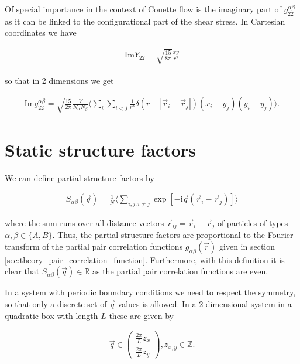 \documentclass[DIV=9,11pt,BCOR=5mm,twoside=semi,abstract]{scrreprt}
\begin{document}
	Of special importance in the context of Couette flow is the imaginary part of $g_{22}^{\alpha\beta}$ as it can be linked to the configurational part of the shear stress. In Cartesian coordinates we have 
	
	\begin{align}
		\text{Im}Y_{22} = \sqrt{\frac{15}{8\pi}} \frac{xy}{r^2}
	\end{align}

	so that in 2 dimensions we get
	
	\begin{align}
		\text{Im} g_{22}^{\alpha\beta} = \sqrt{\frac{15}{2\pi}} \frac{V}{N_{\alpha} N_{\beta}} \langle \sum_{i} \sum_{i < j} \frac{1}{r^3} \delta \left( r - | \vec{r}_i - \vec{r}_j | \right) (x_i - y_j)(y_i - y_j) \rangle.
	\end{align}


	\section{Static structure factors}
	\label{sec:theory_structure_factors}
	
	We can define partial structure factors by
	
	\begin{align}
		S_{\alpha\beta}(\vec{q}) = \frac{1}{N} \langle \sum_{i,j,i \neq j} \exp\left[ -\text{i} \vec{q} (\vec{r}_i - \vec{r}_j) \right] \rangle
	\end{align}

	where the sum runs over all distance vectors $\vec{r}_{ij} = \vec{r}_i - \vec{r}_j$ of particles of types $\alpha,\beta \in \{A,B\}$. Thus, the partial structure factors are proportional to the Fourier transform of the partial pair correlation functions $g_{\alpha\beta}(\vec{r})$ given in section \ref{sec:theory_pair_correlation_function}. Furthermore, with this definition it is clear that $S_{\alpha\beta} (\vec{q}) \in \mathds{R}$ as the partial pair correlation functions are even. \par
	
	In a system with periodic boundary conditions we need to respect the symmetry, so that only a discrete set of $\vec{q}$ values is allowed. In a 2 dimensional system in a quadratic box with length $L$ these are given by 
	
	\begin{align}
		\vec{q} \in 
		\begin{pmatrix}
			\frac{2\pi}{L} z_x\\
			\frac{2\pi}{L} z_y
		\end{pmatrix}, 
		z_{x,y} \in \mathds{Z}.
	\end{align}
\end{document}
